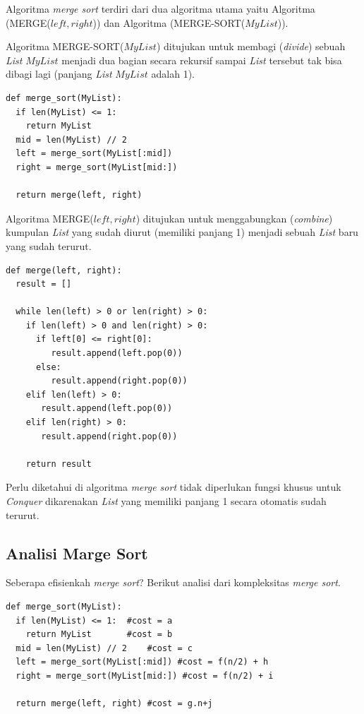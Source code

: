 \documentclass[12pt]{book}%
\begin{document}
Algoritma \textit{merge sort} terdiri dari dua algoritma utama yaitu Algoritma (MERGE($left,right$)) dan Algoritma (MERGE-SORT($MyList$)). 

Algoritma MERGE-SORT($MyList$) ditujukan untuk membagi (\textit{divide}) sebuah \textit{List} $MyList$ menjadi dua bagian secara rekursif sampai \textit{List} tersebut tak bisa dibagi lagi (panjang \textit{List} $MyList$ adalah 1). 

\lstset{language=Python}
\label{lst:MargeSort}
\begin{lstlisting}[frame=single]
def merge_sort(MyList):
  if len(MyList) <= 1:
    return MyList
  mid = len(MyList) // 2
  left = merge_sort(MyList[:mid])
  right = merge_sort(MyList[mid:])
	
  return merge(left, right)
\end{lstlisting}

Algoritma MERGE($left,right$) ditujukan untuk menggabungkan (\textit{combine}) kumpulan \textit{List} yang sudah diurut (memiliki panjang 1) menjadi sebuah \textit{List} baru yang sudah terurut.

\lstset{language=Python}
\label{lst:Marge}
\begin{lstlisting}[frame=single]
def merge(left, right):
  result = []
	
  while len(left) > 0 or len(right) > 0:
    if len(left) > 0 and len(right) > 0:
      if left[0] <= right[0]:
         result.append(left.pop(0))
      else:
         result.append(right.pop(0))
    elif len(left) > 0:
       result.append(left.pop(0))
    elif len(right) > 0:
       result.append(right.pop(0))

    return result
\end{lstlisting}

Perlu diketahui di algoritma \textit{merge sort} tidak diperlukan fungsi khusus untuk \textit{Conquer} dikarenakan \textit{List} yang memiliki panjang 1 secara otomatis sudah terurut.

\newpage{}
\subsection{Analisi Marge Sort}
Seberapa efisienkah \textit{merge sort}? Berikut analisi dari kompleksitas \textit{merge sort}.

\lstset{language=Python}
\label{lst:MargeSort}
\begin{lstlisting}[frame=single]
def merge_sort(MyList):
  if len(MyList) <= 1:	#cost = a
    return MyList		#cost = b
  mid = len(MyList) // 2	#cost = c
  left = merge_sort(MyList[:mid]) #cost = f(n/2) + h
  right = merge_sort(MyList[mid:]) #cost = f(n/2) + i
	
  return merge(left, right)	#cost = g.n+j
\end{lstlisting}
\end{document}
